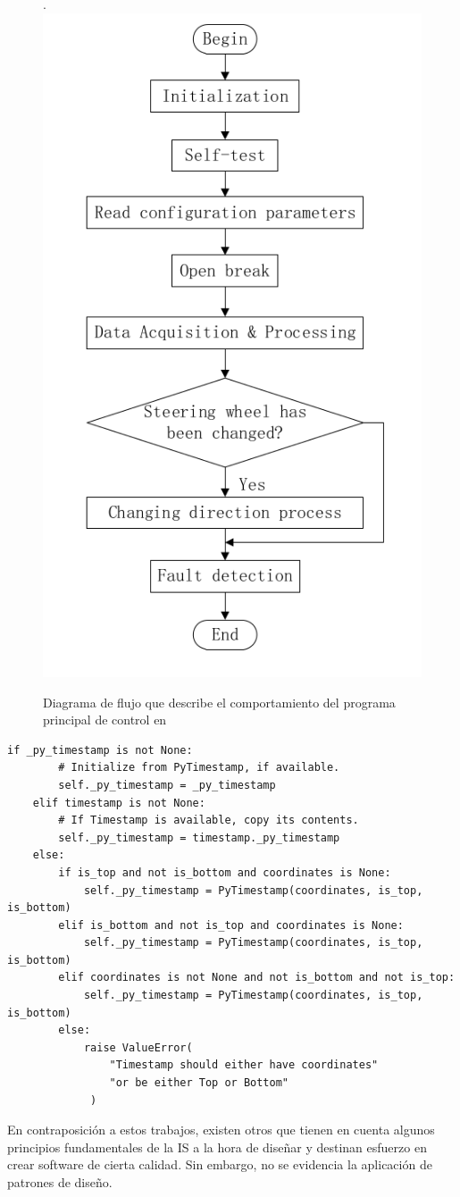 \begin{figure}[H]
	\centering
	\caption{Diagrama de flujo que describe el comportamiento del programa principal de control en \cite{bad-desing-auto}}.
	\label{flujo}
    \includegraphics[width=0.5\linewidth]{main_flujo.png}
\end{figure}

\begin{lstlisting}[caption=Extracto de código de \cite{code-2}.,label={ifanidados}]
 if _py_timestamp is not None:
        # Initialize from PyTimestamp, if available.
        self._py_timestamp = _py_timestamp
    elif timestamp is not None:
        # If Timestamp is available, copy its contents.
        self._py_timestamp = timestamp._py_timestamp
    else:
        if is_top and not is_bottom and coordinates is None:
            self._py_timestamp = PyTimestamp(coordinates, is_top, is_bottom)
        elif is_bottom and not is_top and coordinates is None:
            self._py_timestamp = PyTimestamp(coordinates, is_top, is_bottom)
        elif coordinates is not None and not is_bottom and not is_top:
            self._py_timestamp = PyTimestamp(coordinates, is_top, is_bottom)
        else:
            raise ValueError(
                "Timestamp should either have coordinates"
                "or be either Top or Bottom"
             )
\end{lstlisting}


En contraposición a estos trabajos, existen otros \cite{good-desing-agrobot,good-desing-street} que tienen en cuenta algunos principios fundamentales de la \gls{IS} a la hora de diseñar y destinan esfuerzo en crear software de cierta calidad. Sin embargo, no se evidencia la aplicación de patrones de diseño.

